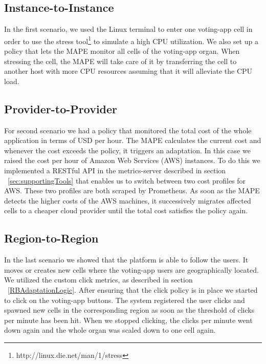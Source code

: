 \documentclass{seal_thesis}
\begin{document}
\subsection{Instance-to-Instance}

In the first scenario, we used the Linux terminal to enter one voting-app cell in order to use the stress tool\footnote{http://linux.die.net/man/1/stress} to simulate a high CPU utilization.
We also set up a policy that lets the MAPE monitor all cells of the voting-app organ. When stressing the cell, the MAPE will take care of it by transferring the cell to another host with more CPU resources assuming that it will alleviate the CPU load.

\subsection{Provider-to-Provider}

For second scenario we had a policy that monitored the total cost of the whole application in terms of USD per hour.
The MAPE calculates the current cost and whenever the cost exceeds the policy, it triggers an adaptation.
In this case we raised the cost per hour of Amazon Web Services (AWS) instances.
To do this we implemented a RESTful API in the metrics-server described in section ~\ref{sec:supportingTools} that enables us to switch between two cost profiles for AWS.
These two profiles are both scraped by Prometheus.
As soon as the MAPE detects the higher costs of the AWS machines, it successively migrates affected cells to a cheaper cloud provider until the total cost satisfies the policy again.

\subsection{Region-to-Region}
In the last scenario we showed that the platform is able to follow the users.
It moves or creates new cells where the voting-app users are geographically located.
We utilized the custom click metrics, as described in section ~\ref{RBAdaptationLogic}.
After ensuring that the click policy is in place we started to click on the voting-app buttons.
The system registered the user clicks and spawned new cells in the corresponding region as soon as the threshold of clicks per minute has been hit.
When we stopped clicking, the clicks per minute went down again and the whole organ was scaled down to one cell again.


\end{document}

